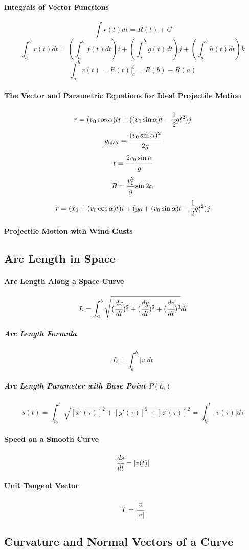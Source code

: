 \documentclass{article}
\begin{document}
            \paragraph{Integrals of Vector Functions}
                \[\int r(t)dt=R(t)+C\]
                \[\int_a^br(t)dt=(\int_a^bf(t)dt)i+(\int_a^bg(t)dt)j+(\int_a^bh(t)dt)k\]
                \[\int_a^br(t)=R(t)\Bigg]_a^b=R(b)-R(a)\]
            \paragraph{The Vector and Parametric Equations for Ideal Projectile Motion}
                \[r=(v_0\cos\alpha)ti+((v_0\sin\alpha)t-\cfrac{1}{2}gt^2)j\]
                \[y_{\text{max}}=\cfrac{(v_0\sin\alpha)^2}{2g}\]
                \[t=\cfrac{2v_0\sin\alpha}{g}\]
                \[R=\cfrac{v_0^2}{g}\sin 2\alpha\]
                \[r=(x_0+(v_0\cos\alpha)t)i+(y_0+(v_0\sin\alpha)t-\cfrac{1}{2}gt^2)j\]
            \paragraph{Projectile Motion with Wind Gusts}
        \subsection{Arc Length in Space}
            \paragraph{Arc Length Along a Space Curve}
                \[L=\int_a^b\sqrt{(\cfrac{dx}{dt})^2+(\cfrac{dy}{dt})^2+(\cfrac{dz}{dt})^2}dt\]
                \subparagraph{Arc Length Formula}
                    \[L=\int_a^b|v|dt\]
                \subparagraph{Arc Length Parameter with Base Point $P(t_0)$}
                    \[s(t)=\int_{t_0}^t\sqrt{[x'(\tau)]^2+[y'(\tau)]^2+[z'(\tau)]^2}=\int_{t_0}^t|v(\tau)|d\tau\]
            \paragraph{Speed on a Smooth Curve}
                \[\cfrac{ds}{dt}=|v(t)|\]
            \paragraph{Unit Tangent Vector}    
                \[T=\cfrac{v}{|v|}\]
        \subsection{Curvature and Normal Vectors of a Curve}
\end{document}
